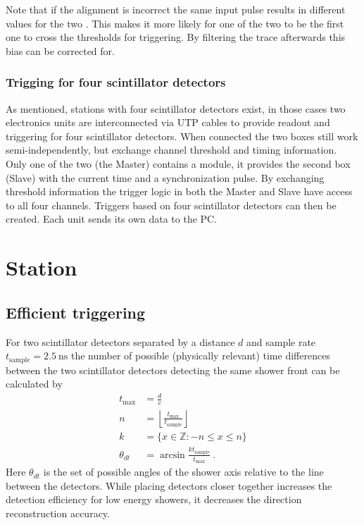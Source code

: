Note that if the \adc alignment is incorrect the same input pulse results in different \adc values for the two \adcs. This makes it more likely for one of the two \adcs to be the first one to cross the thresholds for triggering. By filtering the trace afterwards this bias can be corrected for.


\subsubsection{Trigging for four scintillator detectors}

As mentioned, stations with four scintillator detectors exist, in those cases two \hisparc electronics units are interconnected via UTP cables to provide readout and triggering for four scintillator detectors. When connected the two boxes still work semi-independently, but exchange channel threshold and timing information. Only one of the two (the Master) contains a \gps module, it provides the second box (Slave) with the current time and a synchronization pulse. By exchanging threshold information the trigger logic in both the Master and Slave have access to all four channels. Triggers based on four scintillator detectors can then be created. Each unit sends its own data to the PC.


\section{Station}

\subsection{Efficient triggering}

For two scintillator detectors separated by a distance $d$ and sample rate $t_{\mathrm{sample}} = \SI{2.5}{\ns}$ the number of possible (physically relevant) time differences between the two scintillator detectors detecting the same shower front can be calculated by
%
\begin{equation}
    \begin{split}
        t_{\mathrm{max}} &= \frac{d}{c} \\
        n &= \left\lfloor \frac{t_{\mathrm{max}}}{t_{\mathrm{sample}}} \right\rfloor \\
        k &= \{x \in \mathbb{Z} : -n \leq x \leq n \} \\
        \theta_{dt} &= \arcsin \frac{k t_{\mathrm{sample}}}{t_{\mathrm{max}}} \ .
    \end{split}
\end{equation}
%
Here $\theta_{dt}$ is the set of possible angles of the shower axis relative to the line between the detectors. While placing detectors closer together increases the detection efficiency for low energy showers, it decreases the direction reconstruction accuracy.

